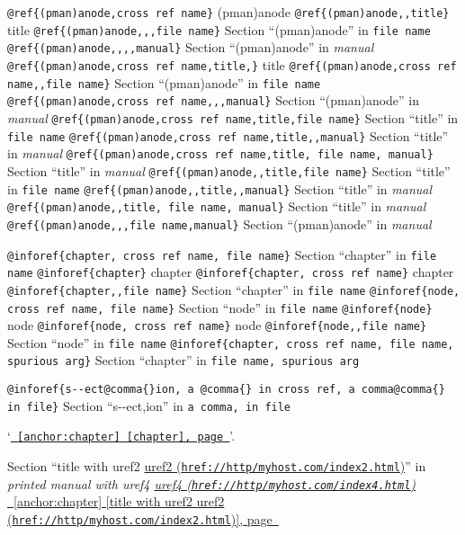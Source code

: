 \documentclass{book}
\begin{document}
\texttt{@ref\{(pman)anode,cross ref name\}} (pman)anode
\texttt{@ref\{(pman)anode,,title\}} title
\texttt{@ref\{(pman)anode,,,file name\}} Section ``(pman)anode'' in \texttt{file name}
\texttt{@ref\{(pman)anode,,,,manual\}} Section ``(pman)anode'' in \textit{manual}
\texttt{@ref\{(pman)anode,cross ref name,title,\}} title
\texttt{@ref\{(pman)anode,cross ref name,,file name\}} Section ``(pman)anode'' in \texttt{file name}
\texttt{@ref\{(pman)anode,cross ref name,,,manual\}} Section ``(pman)anode'' in \textit{manual}
\texttt{@ref\{(pman)anode,cross ref name,title,file name\}} Section ``title'' in \texttt{file name}
\texttt{@ref\{(pman)anode,cross ref name,title,,manual\}} Section ``title'' in \textit{manual}
\texttt{@ref\{(pman)anode,cross ref name,title, file name, manual\}} Section ``title'' in \textit{manual}
\texttt{@ref\{(pman)anode,,title,file name\}} Section ``title'' in \texttt{file name}
\texttt{@ref\{(pman)anode,,title,,manual\}} Section ``title'' in \textit{manual}
\texttt{@ref\{(pman)anode,,title, file name, manual\}} Section ``title'' in \textit{manual}
\texttt{@ref\{(pman)anode,,,file name,manual\}} Section ``(pman)anode'' in \textit{manual}


\texttt{@inforef\{chapter, cross ref name, file name\}} Section ``chapter'' in \texttt{file name}
\texttt{@inforef\{chapter\}} chapter
\texttt{@inforef\{chapter, cross ref name\}} chapter
\texttt{@inforef\{chapter,,file name\}} Section ``chapter'' in \texttt{file name}
\texttt{@inforef\{node, cross ref name, file name\}} Section ``node'' in \texttt{file name}
\texttt{@inforef\{node\}} node
\texttt{@inforef\{node, cross ref name\}} node
\texttt{@inforef\{node,,file name\}} Section ``node'' in \texttt{file name}
\texttt{@inforef\{chapter, cross ref name, file name, spurious arg\}} Section ``chapter'' in \texttt{file name, spurious arg}

\texttt{@inforef\{s{-}{-}ect@comma\{\}ion, a @comma\{\} in cross
ref, a comma@comma\{\} in file\}}
Section ``s{-}{-}ect,ion'' in \texttt{a comma, in file}

`\texttt{\hyperref[anchor:chapter]{\chaptername~\ref*{anchor:chapter} [chapter], page~\pageref*{anchor:chapter}}}'.

Section ``title with uref2 \href{href://http/myhost.com/index2.html}{uref2 (\nolinkurl{href://http/myhost.com/index2.html})}'' in \textit{printed manual with uref4 \href{href://http/myhost.com/index4.html}{uref4 (\nolinkurl{href://http/myhost.com/index4.html})}}
\hyperref[anchor:chapter]{\chaptername~\ref*{anchor:chapter} [title with uref2 \href{href://http/myhost.com/index2.html}{uref2 (\nolinkurl{href://http/myhost.com/index2.html})}], page~\pageref*{anchor:chapter}}
\end{document}
